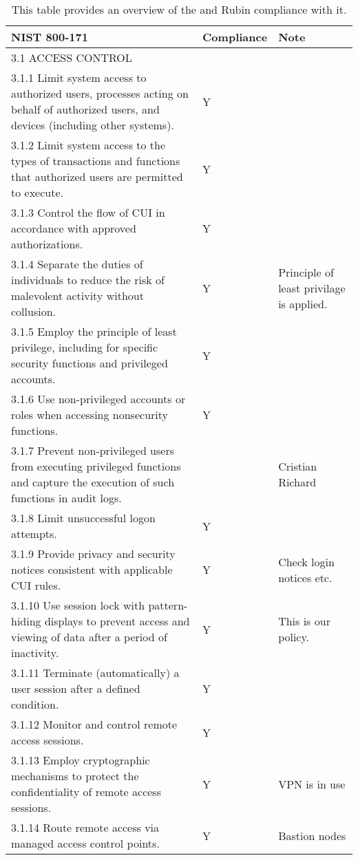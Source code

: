 \tiny \begin{longtable} {|p{}|p{}|p{} |} \caption{This table provides an overview of the  and Rubin compliance with it. \label{tab:compliance}}\\
\hline
\textbf{NIST 800-171}&\textbf{Compliance}&\textbf{Note} \\ \hline
{3.1 ACCESS CONTROL}&& \\ \hline
{3.1.1 Limit system access to authorized users, processes acting on behalf of authorized users, and devices (including other systems).}&{Y}& \\ \hline
{3.1.2 Limit system access to the types of transactions and functions that authorized users are permitted to execute.}&{Y}& \\ \hline
{3.1.3 Control the flow of CUI in accordance with approved authorizations.}&{Y}& \\ \hline
{3.1.4 Separate the duties of individuals to reduce the risk of malevolent activity without collusion.}&{Y}&{Principle of least privilage is applied.} \\ \hline
{3.1.5 Employ the principle of least privilege, including for specific security functions and privileged accounts.}&{Y}& \\ \hline
{3.1.6 Use non-privileged accounts or roles when accessing nonsecurity functions.}&{Y}& \\ \hline
{3.1.7 Prevent non-privileged users from executing privileged functions and capture the execution of such functions in audit logs.}&{}&{Cristian \/ Richard} \\ \hline
{3.1.8 Limit unsuccessful logon attempts.}&{Y}& \\ \hline
{3.1.9 Provide privacy and security notices consistent with applicable CUI rules.}&{Y}&{Check login notices etc.} \\ \hline
{3.1.10 Use session lock with pattern-hiding displays to prevent access and viewing of data after a period of inactivity.}&{Y}&{This is our policy.} \\ \hline
{3.1.11 Terminate (automatically) a user session after a defined condition.}&{Y}& \\ \hline
{3.1.12 Monitor and control remote access sessions.}&{Y}& \\ \hline
{3.1.13 Employ cryptographic mechanisms to protect the confidentiality of remote access sessions.}&{Y}&{VPN is in use} \\ \hline
{3.1.14 Route remote access via managed access control points.}&{Y}&{Bastion nodes} \\ \hline

\end{longtable}
